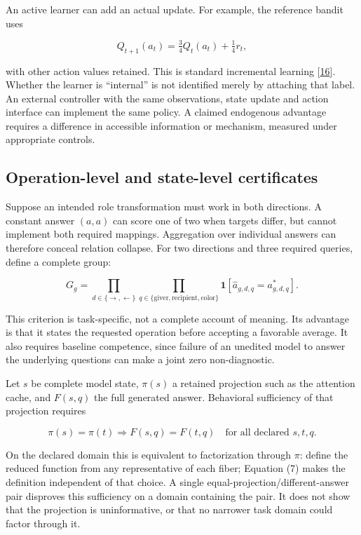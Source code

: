 \documentclass[11pt,letterpaper]{article}
\begin{document}
An active learner can add an actual update. For example, the reference bandit uses

\begin{equation}
Q_{t+1}(a_t)=\tfrac34 Q_t(a_t)+\tfrac14 r_t, \tag{5}
\end{equation}

with other action values retained. This is standard incremental learning [\hyperref[ref:16]{16}]. Whether the learner is “internal” is not identified merely by attaching that label. An external controller with the same observations, state update and action interface can implement the same policy. A claimed endogenous advantage requires a difference in accessible information or mechanism, measured under appropriate controls.

\subsection{Operation-level and state-level certificates}

Suppose an intended role transformation must work in both directions. A constant answer \((a,a)\) can score one of two when targets differ, but cannot implement both required mappings. Aggregation over individual answers can therefore conceal relation collapse. For two directions and three required queries, define a complete group:

\begin{equation}
G_g=\prod_{d\in\{\rightarrow,\leftarrow\}}
\prod_{q\in\{\mathrm{giver},\mathrm{recipient},\mathrm{color}\}}
\mathbf1[\widehat a_{g,d,q}=a^*_{g,d,q}]. \tag{6}
\end{equation}

This criterion is task-specific, not a complete account of meaning. Its advantage is that it states the requested operation before accepting a favorable average. It also requires baseline competence, since failure of an unedited model to answer the underlying questions can make a joint zero non-diagnostic.

Let \(s\) be complete model state, \(\pi(s)\) a retained projection such as the attention cache, and \(F(s,q)\) the full generated answer. Behavioral sufficiency of that projection requires

\begin{equation}
\pi(s)=\pi(t)\Longrightarrow F(s,q)=F(t,q)
\quad\text{for all declared }s,t,q. \tag{7}
\end{equation}

On the declared domain this is equivalent to factorization through \(\pi\): define the reduced function from any representative of each fiber; Equation (7) makes the definition independent of that choice. A single equal-projection/different-answer pair disproves this sufficiency on a domain containing the pair. It does not show that the projection is uninformative, or that no narrower task domain could factor through it.
\end{document}
